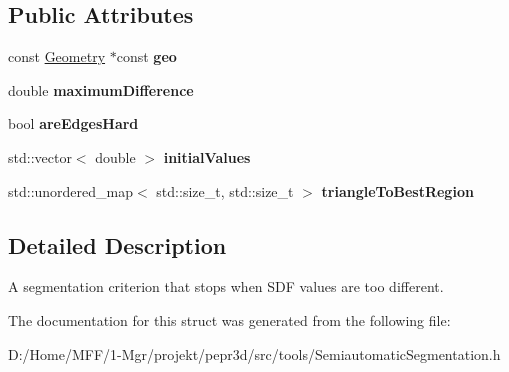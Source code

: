 \subsection*{Public Attributes}
\begin{DoxyCompactItemize}
\item 
\mbox{\label{structpepr3d_1_1_semiautomatic_segmentation_1_1_s_d_f_stopping_add1b1df963eb281249066ffc8caf28e3}} 
const \mbox{\hyperlink{classpepr3d_1_1_geometry}{Geometry}} $\ast$const {\bfseries geo}
\item 
\mbox{\label{structpepr3d_1_1_semiautomatic_segmentation_1_1_s_d_f_stopping_ab88bf8a7dcafc3c408beccba9507fa9f}} 
double {\bfseries maximum\+Difference}
\item 
\mbox{\label{structpepr3d_1_1_semiautomatic_segmentation_1_1_s_d_f_stopping_a02a7dfbd90f1326160f68f7b0feb3812}} 
bool {\bfseries are\+Edges\+Hard}
\item 
\mbox{\label{structpepr3d_1_1_semiautomatic_segmentation_1_1_s_d_f_stopping_a9b31c3ff6551cd006b1c3960e1404e8b}} 
std\+::vector$<$ double $>$ {\bfseries initial\+Values}
\item 
\mbox{\label{structpepr3d_1_1_semiautomatic_segmentation_1_1_s_d_f_stopping_a609511530c45cd2adb70a6bc9c310c7d}} 
std\+::unordered\+\_\+map$<$ std\+::size\+\_\+t, std\+::size\+\_\+t $>$ {\bfseries triangle\+To\+Best\+Region}
\end{DoxyCompactItemize}


\subsection{Detailed Description}
A segmentation criterion that stops when S\+DF values are too different. 

The documentation for this struct was generated from the following file\+:\begin{DoxyCompactItemize}
\item 
D\+:/\+Home/\+M\+F\+F/1-\/\+Mgr/projekt/pepr3d/src/tools/Semiautomatic\+Segmentation.\+h\end{DoxyCompactItemize}
